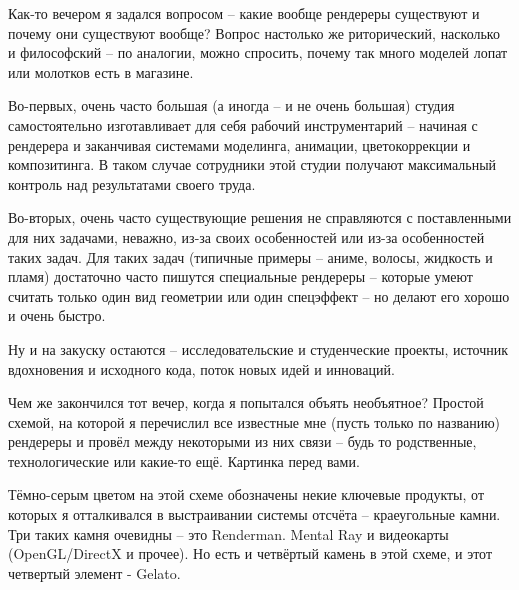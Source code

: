 Как-то вечером я задался вопросом – какие вообще
   рендереры существуют и почему они существуют вообще? Вопрос
   настолько же риторический, насколько и философский – по аналогии,
   можно спросить, почему так много моделей лопат или молотков есть в
   магазине.
 

Во-первых, очень часто большая (а иногда – и не
   очень большая) студия самостоятельно изготавливает для себя рабочий
   инструментарий – начиная с рендерера и заканчивая системами
   моделинга, анимации, цветокоррекции и композитинга. В таком случае
   сотрудники этой студии получают максимальный контроль над
   результатами своего труда.
 

Во-вторых, очень часто существующие решения не
   справляются с поставленными для них задачами, неважно, из-за своих
   особенностей или из-за особенностей таких задач. Для таких задач
   (типичные примеры – аниме, волосы, жидкость и пламя) достаточно
   часто пишутся специальные рендереры – которые умеют считать только
   один вид геометрии или один спецэффект – но делают его хорошо и
   очень быстро.
 

Ну и на закуску остаются – исследовательские и
   студенческие проекты, источник вдохновения и исходного кода, поток
   новых идей и инноваций.
 

Чем же закончился тот вечер, когда я попытался
   объять необъятное? Простой схемой, на которой я перечислил все
   известные мне (пусть только по названию) рендереры и провёл между
   некоторыми из них связи – будь то родственные, технологические или
   какие-то ещё. Картинка перед вами. 

 

Тёмно-серым цветом на этой схеме обозначены некие
   ключевые продукты, от которых я отталкивался в выстраивании системы
   отсчёта – краеугольные камни. Три таких камня очевидны – это
   Renderman. Mental Ray и видеокарты (OpenGL/DirectX и прочее). Но
   есть и четвёртый камень в этой схеме, и этот четвертый элемент -
   Gelato.

